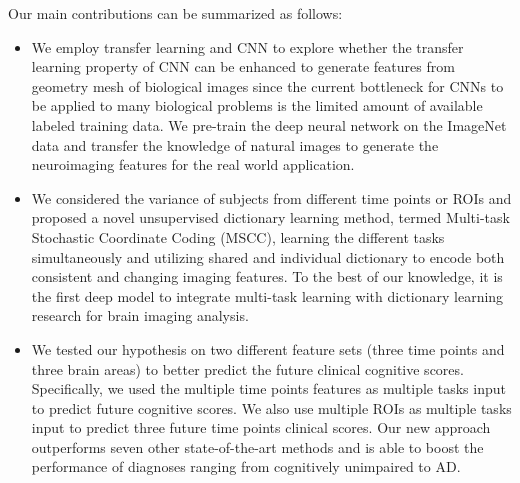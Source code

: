\documentclass[10pt,twocolumn,letterpaper]{article}
\begin{document}
Our main contributions can be summarized as follows:
\begin{itemize}
\vspace{-0.5em}
  \item We employ transfer learning and CNN to explore whether the transfer learning property of CNN can be enhanced to generate features from geometry mesh of biological images since the current bottleneck for CNNs to be applied to many biological problems is the limited amount of available labeled training data. We pre-train the deep neural network on the ImageNet data and transfer the knowledge of natural images to generate the neuroimaging features for the real world application.
\vspace{-0.5em}
  \item We considered the variance of subjects from different time points or ROIs and proposed a novel unsupervised dictionary learning method, termed Multi-task Stochastic Coordinate Coding (MSCC), learning the different tasks simultaneously and utilizing shared and individual dictionary to encode both consistent and changing imaging features. To the best of our knowledge, it is the first deep model to integrate multi-task learning with dictionary learning research for brain imaging analysis.
\vspace{-0.5em}
  \item We tested our hypothesis on two different feature sets (three time points and three brain areas) to better predict the future clinical cognitive scores. Specifically, we used the multiple time points features as multiple tasks input to predict future cognitive scores. We also use multiple ROIs as multiple tasks input to predict three future time points clinical scores. Our new approach outperforms seven other state-of-the-art methods and is able to boost the performance of diagnoses ranging from cognitively unimpaired to AD.
\end{itemize}
\vspace{-0.5em}
\end{document}
